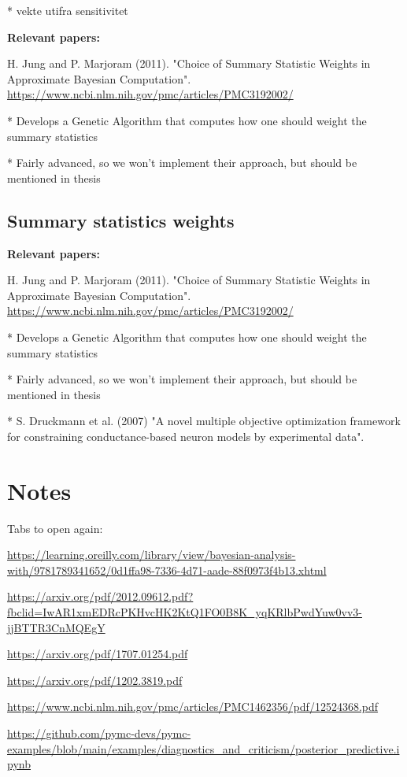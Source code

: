 * vekte utifra sensitivitet

\textbf{Relevant papers:}

H. Jung and P. Marjoram (2011). "Choice of Summary Statistic Weights in Approximate Bayesian Computation". \url{https://www.ncbi.nlm.nih.gov/pmc/articles/PMC3192002/}

* Develops a Genetic Algorithm that computes how one should weight the summary statistics 

* Fairly advanced, so we won't implement their approach, but should be mentioned in thesis

\subsection{Summary statistics weights}

\textbf{Relevant papers:}

H. Jung and P. Marjoram (2011). "Choice of Summary Statistic Weights in Approximate Bayesian Computation". \url{https://www.ncbi.nlm.nih.gov/pmc/articles/PMC3192002/}

* Develops a Genetic Algorithm that computes how one should weight the summary statistics 

* Fairly advanced, so we won't implement their approach, but should be mentioned in thesis

* S. Druckmann et al. (2007) "A novel multiple objective optimization framework for constraining conductance-based neuron models by experimental data". 

\section{Notes}

Tabs to open again:

\url{https://learning.oreilly.com/library/view/bayesian-analysis-with/9781789341652/0d1ffa98-7336-4d71-aade-88f0973f4b13.xhtml}

\url{https://arxiv.org/pdf/2012.09612.pdf?fbclid=IwAR1xmEDRcPKHvcHK2KtQ1FO0B8K_yqKRlbPwdYuw0vv3-jjBTTR3CnMQEgY}

\url{https://arxiv.org/pdf/1707.01254.pdf}

\url{https://arxiv.org/pdf/1202.3819.pdf}

\url{https://www.ncbi.nlm.nih.gov/pmc/articles/PMC1462356/pdf/12524368.pdf}

\url{https://github.com/pymc-devs/pymc-examples/blob/main/examples/diagnostics_and_criticism/posterior_predictive.ipynb}

